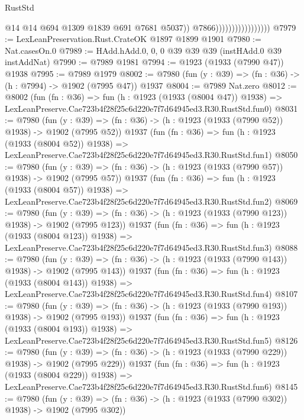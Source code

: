 \begin{lexlean}{RustStd}
\begin{coremodule}
                                          @14
                                          @14
                                          @694
                                          @1309
                                          @1839
                                          @691
                                          @7681
                                          @5037))
                                      @7866)))))))))))))))))
@7979 := LexLeanPreservation.Rust.CrateOK @1897 @1899 @1901
@7980 := Nat.casesOn.{0}
@7989 := HAdd.hAdd.{0, 0, 0} @39 @39 @39 (instHAdd.{0} @39 instAddNat)
@7990 := @7989 @1981
@7994 := @1923 (@1933 (@7990 @47)) @1938
@7995 := @7989 @1979
@8002 := @7980 (fun (y : @39) => (fn : @36) -> (h : @7994) -> @1902 (@7995 @47)) @1937
@8004 := @7989 Nat.zero
@8012 := @8002
    (fun (fn : @36) =>
    fun (h : @1923 (@1933 (@8004 @47)) @1938) =>
    LexLeanPreserve.Cae723b4f28f25c6d220e7f7d64945ed3.R30.RustStd.fun0)
@8031 := @7980
    (fun (y : @39) => (fn : @36) -> (h : @1923 (@1933 (@7990 @52)) @1938) -> @1902 (@7995 @52))
    @1937
    (fun (fn : @36) =>
    fun (h : @1923 (@1933 (@8004 @52)) @1938) =>
    LexLeanPreserve.Cae723b4f28f25c6d220e7f7d64945ed3.R30.RustStd.fun1)
@8050 := @7980
    (fun (y : @39) => (fn : @36) -> (h : @1923 (@1933 (@7990 @57)) @1938) -> @1902 (@7995 @57))
    @1937
    (fun (fn : @36) =>
    fun (h : @1923 (@1933 (@8004 @57)) @1938) =>
    LexLeanPreserve.Cae723b4f28f25c6d220e7f7d64945ed3.R30.RustStd.fun2)
@8069 := @7980
    (fun (y : @39) => (fn : @36) -> (h : @1923 (@1933 (@7990 @123)) @1938) -> @1902 (@7995 @123))
    @1937
    (fun (fn : @36) =>
    fun (h : @1923 (@1933 (@8004 @123)) @1938) =>
    LexLeanPreserve.Cae723b4f28f25c6d220e7f7d64945ed3.R30.RustStd.fun3)
@8088 := @7980
    (fun (y : @39) => (fn : @36) -> (h : @1923 (@1933 (@7990 @143)) @1938) -> @1902 (@7995 @143))
    @1937
    (fun (fn : @36) =>
    fun (h : @1923 (@1933 (@8004 @143)) @1938) =>
    LexLeanPreserve.Cae723b4f28f25c6d220e7f7d64945ed3.R30.RustStd.fun4)
@8107 := @7980
    (fun (y : @39) => (fn : @36) -> (h : @1923 (@1933 (@7990 @193)) @1938) -> @1902 (@7995 @193))
    @1937
    (fun (fn : @36) =>
    fun (h : @1923 (@1933 (@8004 @193)) @1938) =>
    LexLeanPreserve.Cae723b4f28f25c6d220e7f7d64945ed3.R30.RustStd.fun5)
@8126 := @7980
    (fun (y : @39) => (fn : @36) -> (h : @1923 (@1933 (@7990 @229)) @1938) -> @1902 (@7995 @229))
    @1937
    (fun (fn : @36) =>
    fun (h : @1923 (@1933 (@8004 @229)) @1938) =>
    LexLeanPreserve.Cae723b4f28f25c6d220e7f7d64945ed3.R30.RustStd.fun6)
@8145 := @7980
    (fun (y : @39) => (fn : @36) -> (h : @1923 (@1933 (@7990 @302)) @1938) -> @1902 (@7995 @302))

\end{coremodule}
\end{lexlean}
